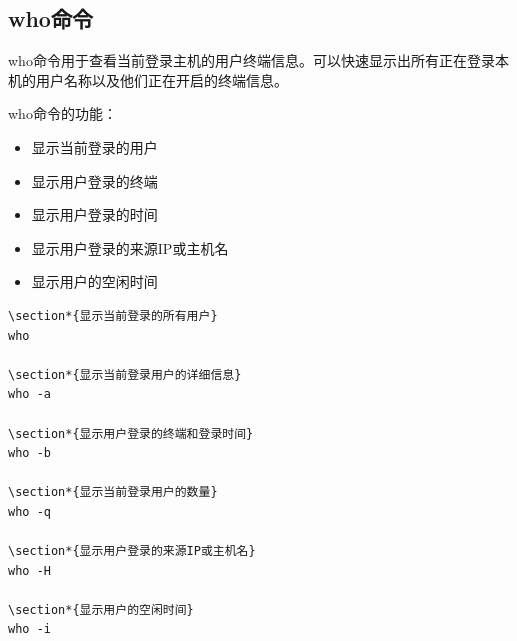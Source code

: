 \documentclass[12pt,UTF8]{ctexbook}
\begin{document}
\subsection{who命令}
who命令用于查看当前登录主机的用户终端信息。可以快速显示出所有正在登录本机的用户名称以及他们正在开启的终端信息。

who命令的功能：
\begin{itemize}
    \item 显示当前登录的用户
    \item 显示用户登录的终端
    \item 显示用户登录的时间
    \item 显示用户登录的来源IP或主机名
    \item 显示用户的空闲时间
\end{itemize}

\begin{verbatim}
\section*{显示当前登录的所有用户}
who

\section*{显示当前登录用户的详细信息}
who -a

\section*{显示用户登录的终端和登录时间}
who -b

\section*{显示当前登录用户的数量}
who -q

\section*{显示用户登录的来源IP或主机名}
who -H

\section*{显示用户的空闲时间}
who -i
\end{verbatim}
\end{document}
